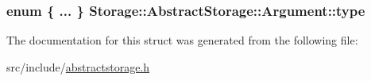 \label{d9/dc9/structStorage_1_1AbstractStorage_1_1Argument_ae6cc69656647a6cccf725a0156373a51}
\hypertarget{structStorage_1_1AbstractStorage_1_1Argument_a77f04e835f26305c4222df78c07f8efd}{
\subsubsection[{type}]{\setlength{\rightskip}{0pt plus 5cm}enum \{ ... \}   {\bf Storage::AbstractStorage::Argument::type}}}
\label{d9/dc9/structStorage_1_1AbstractStorage_1_1Argument_a77f04e835f26305c4222df78c07f8efd}


The documentation for this struct was generated from the following file:\begin{DoxyCompactItemize}
\item 
src/include/\hyperlink{abstractstorage_8h}{abstractstorage.h}\end{DoxyCompactItemize}
